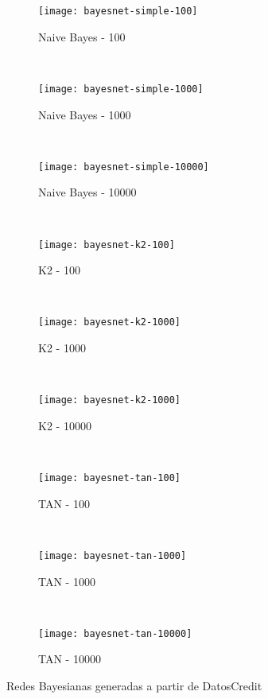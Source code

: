 \documentclass{article}
\begin{document}
			\begin{figure}[h]
				\centering
				\begin{subfigure}{.32\textwidth}
					\centering
					\texttt{[image: bayesnet-simple-100]}
					\caption{Naive Bayes - 100}
					\label{fig:naive_100}
				\end{subfigure} \
				\begin{subfigure}{.32\textwidth}
					\centering
					\texttt{[image: bayesnet-simple-1000]}
					\caption{Naive Bayes - 1000}
					\label{fig:naive_1000}
				\end{subfigure} \
				\begin{subfigure}{.32\textwidth}
					\centering
					\texttt{[image: bayesnet-simple-10000]}
					\caption{Naive Bayes - 10000}
					\label{fig:naive_10000}
				\end{subfigure} \\
				\begin{subfigure}{.32\textwidth}
					\centering
					\texttt{[image: bayesnet-k2-100]}
					\caption{K2 - 100}
					\label{fig:k2_100}
				\end{subfigure} \
				\begin{subfigure}{.32\textwidth}
					\centering
					\texttt{[image: bayesnet-k2-1000]}
					\caption{K2 - 1000}
					\label{fig:k2_1000}
				\end{subfigure} \
				\begin{subfigure}{.32\textwidth}
					\centering
					\texttt{[image: bayesnet-k2-1000]}
					\caption{K2 - 10000}
					\label{fig:k2_10000}
				\end{subfigure} \\
				\begin{subfigure}{.32\textwidth}
					\centering
					\texttt{[image: bayesnet-tan-100]}
					\caption{TAN - 100}
					\label{fig:tan_100}
				\end{subfigure} \
				\begin{subfigure}{.32\textwidth}
					\centering
					\texttt{[image: bayesnet-tan-1000]}
					\caption{TAN - 1000}
					\label{fig:tan_1000}
				\end{subfigure} \
				\begin{subfigure}{.32\textwidth}
					\centering
					\texttt{[image: bayesnet-tan-10000]}
					\caption{TAN - 10000}
					\label{fig:tan_10000}
				\end{subfigure}
				\caption{Redes Bayesianas generadas a partir de DatosCredit}
				\label{fig:bayes_network}
			\end{figure}
\end{document}
